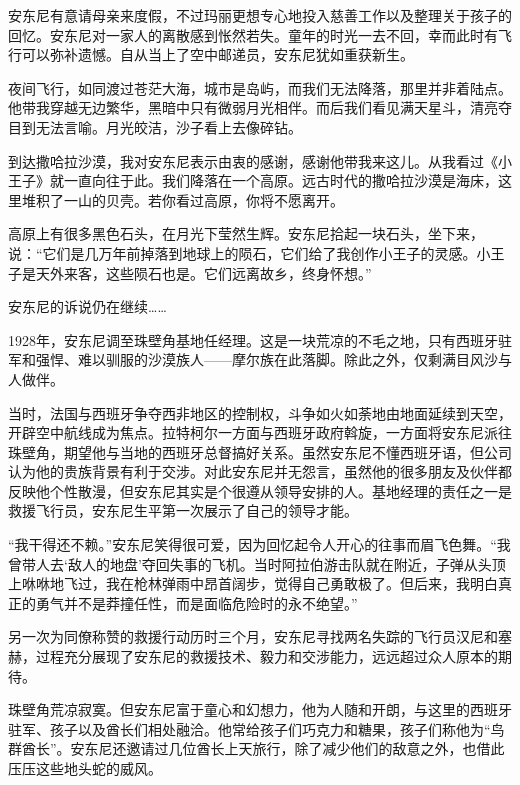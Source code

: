 安东尼有意请母亲来度假，不过玛丽更想专心地投入慈善工作以及整理关于孩子的回忆。安东尼对一家人的离散感到怅然若失。童年的时光一去不回，幸而此时有飞行可以弥补遗憾。自从当上了空中邮递员，安东尼犹如重获新生。


\stoptitle

\starttitle[title={9}]

夜间飞行，如同渡过苍茫大海，城市是岛屿，而我们无法降落，那里并非着陆点。他带我穿越无边繁华，黑暗中只有微弱月光相伴。而后我们看见满天星斗，清亮夺目到无法言喻。月光皎洁，沙子看上去像碎钻。

到达撒哈拉沙漠，我对安东尼表示由衷的感谢，感谢他带我来这儿。从我看过《小王子》就一直向往于此。我们降落在一个高原。远古时代的撒哈拉沙漠是海床，这里堆积了一山的贝壳。若你看过高原，你将不愿离开。

高原上有很多黑色石头，在月光下莹然生辉。安东尼拾起一块石头，坐下来，说：“它们是几万年前掉落到地球上的陨石，它们给了我创作小王子的灵感。小王子是天外来客，这些陨石也是。它们远离故乡，终身怀想。”

安东尼的诉说仍在继续\ldots{}\ldots{}

1928年，安东尼调至珠壁角基地任经理。这是一块荒凉的不毛之地，只有西班牙驻军和强悍、难以驯服的沙漠族人------摩尔族在此落脚。除此之外，仅剩满目风沙与人做伴。

当时，法国与西班牙争夺西非地区的控制权，斗争如火如荼地由地面延续到天空，开辟空中航线成为焦点。拉特柯尔一方面与西班牙政府斡旋，一方面将安东尼派往珠壁角，期望他与当地的西班牙总督搞好关系。虽然安东尼不懂西班牙语，但公司认为他的贵族背景有利于交涉。对此安东尼并无怨言，虽然他的很多朋友及伙伴都反映他个性散漫，但安东尼其实是个很遵从领导安排的人。基地经理的责任之一是救援飞行员，安东尼生平第一次展示了自己的领导才能。

“我干得还不赖。”安东尼笑得很可爱，因为回忆起令人开心的往事而眉飞色舞。“我曾带人去‘敌人的地盘'夺回失事的飞机。当时阿拉伯游击队就在附近，子弹从头顶上咻咻地飞过，我在枪林弹雨中昂首阔步，觉得自己勇敢极了。但后来，我明白真正的勇气并不是莽撞任性，而是面临危险时的永不绝望。”

另一次为同僚称赞的救援行动历时三个月，安东尼寻找两名失踪的飞行员汉尼和塞赫，过程充分展现了安东尼的救援技术、毅力和交涉能力，远远超过众人原本的期待。

珠壁角荒凉寂寞。但安东尼富于童心和幻想力，他为人随和开朗，与这里的西班牙驻军、孩子以及酋长们相处融洽。他常给孩子们巧克力和糖果，孩子们称他为“鸟群酋长”。安东尼还邀请过几位酋长上天旅行，除了减少他们的敌意之外，也借此压压这些地头蛇的威风。

